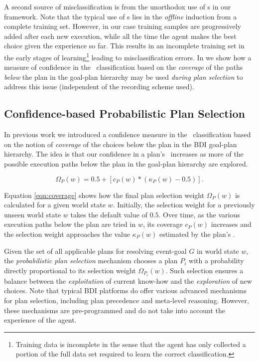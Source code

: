 A second source of misclassification is from the unorthodox use of \dt s in our framework. Note that the typical use of \dt s lies in the \textit{offline} induction from a complete training set. However, in our case training samples are progressively added after each new execution, while all the time the agent makes the best choice given the experience so far. This results in an incomplete training set in the early stages of learning\footnote{Training data is incomplete in the sense that the agent has only collected a portion of the full data set required to learn the correct classification.} leading to misclassification errors. In \cite{Singh:AAMAS10} we show how a measure of confidence in the \dt\ classification based on the \textit{coverage} of the paths \textit{below} the plan in the goal-plan hierarchy may be used \textit{during plan selection} to address this issue (independent of the recording scheme used).

\subsection{Confidence-based Probabilistic Plan Selection}

In previous work \cite{Singh:AAMAS10} we introduced a confidence measure in the \dt\ classification based on the notion of \textit{coverage} of the choices below the plan in the BDI goal-plan hierarchy. The idea is that our confidence in a plan's \dt\ increases as more of the possible execution paths below the plan in the goal-plan hierarchy are explored.

\begin{equation*}\label{eqn:coverage}   
\Omega_P(w) = 0.5 + \left[  c_P(w) *  \left( \kappa_P(w) - 0.5 \right)  \right].
\end{equation*}

Equation \ref{eqn:coverage} shows how the final plan selection weight $\Omega_P(w)$ is calculated for a given world state $w$. Initially, the selection weight for a previously unseen world state $w$ takes the default value of $0.5$. Over time, as the various execution paths below the plan are tried in $w$, its coverage $c_P(w)$ increases and the selection weight approaches the value $\kappa_P(w)$ estimated by the plan's \dt.

Given the set of all applicable plans for resolving event-goal $G$ in world state $w$, the \emph{probabilistic plan selection} mechanism chooses a plan $P_i$ with a probability directly proportional to its selection weight $\Omega_{P_i}(w)$. Such selection ensures a balance between the \emph{exploitation} of current know-how and the \textit{exploration} of new choices. Note that typical BDI platforms do offer various advanced mechanisms for plan selection, including plan precedence and meta-level reasoning. However, these mechanisms are pre-programmed and do not take into account the experience of the agent.



